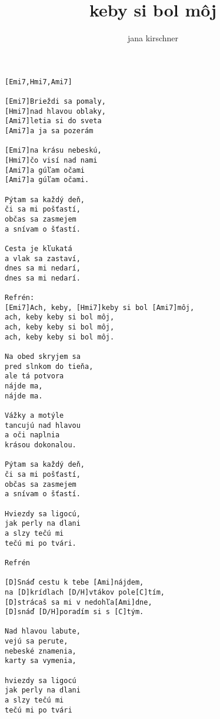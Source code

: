 \author{jana kirschner}
\title{keby si bol môj}
\maketitle
\begin{verbatim}
[Emi7,Hmi7,Ami7]

[Emi7]Brieždi sa pomaly, 
[Hmi7]nad hlavou oblaky, 
[Ami7]letia si do sveta 
[Ami7]a ja sa pozerám 

[Emi7]na krásu nebeskú, 
[Hmi7]čo visí nad nami 
[Ami7]a gúľam očami 
[Ami7]a gúľam očami. 

Pýtam sa každý deň, 
či sa mi pošťastí, 
občas sa zasmejem 
a snívam o šťastí. 

Cesta je kľukatá 
a vlak sa zastaví, 
dnes sa mi nedarí, 
dnes sa mi nedarí. 

Refrén: 
[Emi7]Ach, keby, [Hmi7]keby si bol [Ami7]môj, 
ach, keby keby si bol môj, 
ach, keby keby si bol môj, 
ach, keby keby si bol môj. 

Na obed skryjem sa 
pred slnkom do tieňa, 
ale tá potvora 
nájde ma, 
nájde ma. 

Vážky a motýle 
tancujú nad hlavou 
a oči naplnia 
krásou dokonalou. 

Pýtam sa každý deň, 
či sa mi pošťastí, 
občas sa zasmejem 
a snívam o šťastí. 

Hviezdy sa ligocú, 
jak perly na dlani 
a slzy tečú mi 
tečú mi po tvári. 

Refrén 

[D]Snáď cestu k tebe [Ami]nájdem, 
na [D]krídlach [D/H]vtákov pole[C]tím, 
[D]strácaš sa mi v nedohľa[Ami]dne, 
[D]snáď [D/H]poradím si s [C]tým. 

Nad hlavou labute, 
vejú sa perute, 
nebeské znamenia, 
karty sa vymenia, 

hviezdy sa ligocú 
jak perly na dlani 
a slzy tečú mi 
tečú mi po tvári 
\end{verbatim}